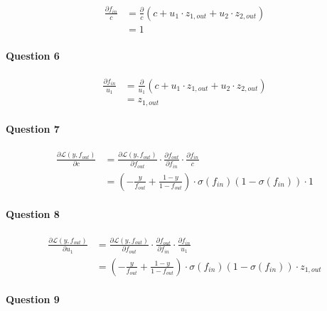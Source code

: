 \documentclass[
  a4paper,
]{article}
\begin{document}
\begin{align*}
\frac{\partial f_{in}}{c}
&=\frac{\partial}{c}\left(c+u_1\cdot z_{1,out}+u_2\cdot z_{2,out}\right) \\
&=1
\end{align*}

\hypertarget{question-6}{%
\paragraph{Question 6}\label{question-6}}

\begin{align*}
\frac{\partial f_{in}}{u_1}
&=\frac{\partial}{u_1}\left(c+u_1\cdot z_{1,out}+u_2\cdot z_{2,out}\right) \\
&=z_{1,out}
\end{align*}

\hypertarget{question-7}{%
\paragraph{Question 7}\label{question-7}}

\begin{align*}
\frac{\partial\mathcal{L}(y,  f_{out})}{\partial c}
&=\frac{\partial\mathcal{L}(y,  f_{out})}{\partial f_{out}}
\cdot\frac{\partial f_{out}}{\partial f_{in}}
\cdot\frac{\partial f_{in}}{c} \\
&=\left(-\frac{y}{ f_{out}}+\frac{1-y}{1- f_{out}}\right)
\cdot\sigma(f_{in})(1-\sigma(f_{in}))
\cdot 1
\end{align*}

\hypertarget{question-8}{%
\paragraph{Question 8}\label{question-8}}

\begin{align*}
\frac{\partial\mathcal{L}(y,  f_{out})}{\partial u_1}
&=\frac{\partial\mathcal{L}(y,  f_{out})}{\partial f_{out}}
\cdot\frac{\partial f_{out}}{\partial f_{in}}
\cdot\frac{\partial f_{in}}{u_1} \\
&=\left(-\frac{y}{ f_{out}}+\frac{1-y}{1- f_{out}}\right)
\cdot\sigma(f_{in})(1-\sigma(f_{in}))
\cdot z_{1,out}
\end{align*}

\hypertarget{question-9}{%
\paragraph{Question 9}\label{question-9}}
\end{document}
